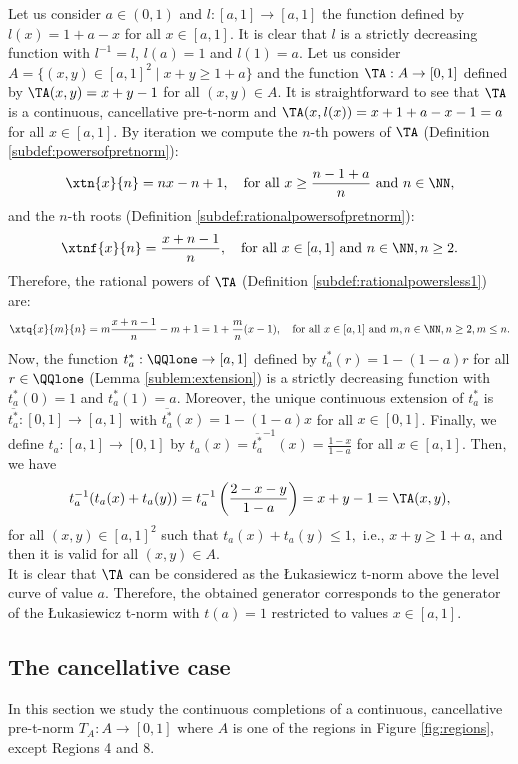 \begin{example}\label{ex:TLK:construction-abovelevelcurve}
	Let us consider $a \in (0,1)$ and $l:[a,1] \to [a,1]$ the function defined by $l(x)=1+a-x$ for all $x \in [a,1]$. It is clear that $l$ is a strictly decreasing function with $l^{-1}=l$, $l(a)=1$ and $l(1)=a$. Let us consider $A=\{(x,y) \in [a,1]^2 \mid x+y \geq 1+a\}$ and the function $\TA: A \to [0,1]$ defined by $\TA(x,y)=x+y-1$ for all $(x,y) \in A$. It is straightforward to see that $\TA$ is a continuous, cancellative pre-t-norm and $\TA(x,l(x))=x+1+a-x-1=a$ for all $x \in [a,1]$. By iteration we compute the $n$-th powers of $\TA$ (Definition \ref{subdef:powersofpretnorm}):
	$$\xtn{x}{n}=nx-n+1, \quad \text{for all } x \geq \frac{n-1+a}{n} \text{ and } n \in \NN,$$
	and the  $n$-th roots  (Definition \ref{subdef:rationalpowersofpretnorm}):
	$$\xtnf{x}{n} = \frac{x+n-1}{n}, \quad \text{for all } x \in [a,1] \text{ and } n \in \NN, n \geq 2.$$
	Therefore, the rational powers of $\TA$ (Definition \ref{subdef:rationalpowersless1}) are:
	$$\xtq{x}{m}{n} = m\frac{x+n-1}{n}-m+1 = 1+\frac{m}{n}(x-1), \quad \text{for all } x \in [a,1] \text{ and } m,n \in \NN,  n \geq 2, m \leq n. $$
	Now, the function $t_{a}^*: \QQlone \to [a,1]$ defined by $t_{a}^*(r)=1-(1-a)r$ for all $r \in \QQlone$ (Lemma \ref{sublem:extension}) is a strictly decreasing function with $t_{a}^*(0)=1$ and $t_{a}^*(1)=a$. Moreover, the unique continuous extension of $t_{a}^*$ is $\overline{t_{a}^*}:[0,1] \to [a,1]$ with $\overline{t_{a}^*}(x)=1-(1-a)x$ for all $x \in [0,1]$.
	Finally, we define $t_{a}:[a,1] \to [0,1]$ by $t_{a}(x)=\overline{t_{a}^*}^{-1}(x)=\frac{1-x}{1-a}$ for all $x \in [a,1]$. Then, we have
	$$t_{a}^{-1}(t_{a}(x)+t_{a}(y)) = t_{a}^{-1}\left(\frac{2-x-y}{1-a}\right) = x+y-1 = \TA(x,y),$$
	for all $(x,y) \in [a,1]^2$ such that $t_a(x)+t_a(y)\leq 1,$ i.e.,  $x+y \geq 1+a$, and then it is valid for all $(x,y) \in A$.\\
	It is clear that $\TA$ can be considered as the Łukasiewicz t-norm above the level curve of value $a$. Therefore, the obtained generator corresponds to the generator of the Łukasiewicz t-norm with $t(a)=1$ restricted to values $x \in  [a,1]$.
\end{example}

\subsection{The cancellative case}\label{subsection:cancellative_completions}

In this section we study the continuous completions of  a continuous, cancellative pre-t-norm $T_A:A \to [0,1]$ where $A$ is one of the regions in Figure \ref{fig:regions}, except Regions 4 and 8.

